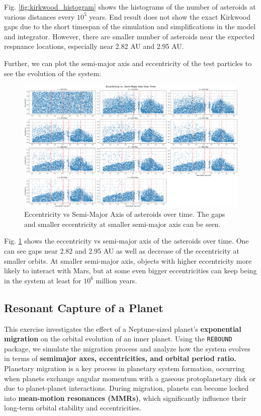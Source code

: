 \documentclass[12pt,a4paper]{article}
\begin{document}
Fig. \ref{fig:kirkwood_histogram} shows the histograms of the number of asteroids at various distances every $10^5$ years.
End result does not show the exact Kirkwood gaps due to the short timespan of the simulation and simplifications in the model and integrator. However, there are smaller number of asteroids near the expected respnance locations, especially near 2.82 AU and 2.95 AU.

Further, we can plot the semi-major axis and eccentricity of the test particles to see the evolution of the system:

\begin{figure}[ht]
  \centering
  \includegraphics[width=\linewidth]{kirkwood/a_e_kirkwood.png}
  \caption{Eccentricity vs Semi-Major Axis of asteroids over time. The gaps and smaller eccentricity at smaller semi-major axis can be seen.}
  \label{fig:kirkwood_a_e}
\end{figure}

Fig. \ref{fig:kirkwood_a_e} shows the eccentricity vs semi-major axis of the asteroids over time. One can see gaps near 2.82 and 2.95 AU as well as decrease of the eccentricity at smaller orbits.
At smaller semi-major axis, objects with higher eccentricity more likely to interact with Mars, but at some even bigger eccentricities can keep being in the system at least for $10^6$ million years.

\subsection{Resonant Capture of a Planet}
This exercise investigates the effect of a Neptune-sized planet's \textbf{exponential migration} on the orbital evolution of an inner planet. Using the \texttt{REBOUND} package, we simulate the migration process and analyze how the system evolves in terms of \textbf{semimajor axes, eccentricities, and orbital period ratio.}
\\ Planetary migration is a key process in planetary system formation, occurring when planets exchange angular momentum with a gaseous protoplanetary disk or due to planet-planet interactions. During migration, planets can become locked into \textbf{mean-motion resonances (MMRs)}, which significantly influence their long-term orbital stability and eccentricities.
\end{document}

